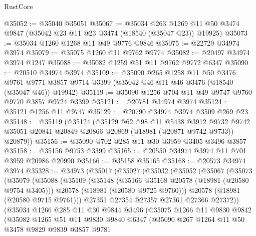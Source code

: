 \begin{lexlean}{RustCore}
\begin{coremodule}
@35052 := @35040 @35051
@35067 := @35034
    @263
    @1269
    @11
    @50
    @3474
    @9847
    (@35042 @23 @11 @23 @3474 (@18540 (@35047 @23)) @19925)
@35073 := @35034 @1260 @1268 @11 @49 @9776 @9846
@35075 := @22729 @34974 @3974
@35079 := @35075 @1260 @11 @9762 @9774
@35082 := @20497 @34974 @3974 @1247
@35088 := @35082 @1259 @51 @11 @9762 @9772 @6347
@35090 := @20510 @34974 @3974
@35109 := @35090
    @265
    @1258
    @11
    @50
    @3476
    @9761
    @9771
    @3857
    @9714
    @3399
    (@35042 @46 @11 @46 @3476 (@18540 (@35047 @46)) @19942)
@35119 := @35090 @1256 @704 @11 @49 @9747 @9760 @9770 @3857 @9724 @3399
@35121 := @20781 @34974 @3974
@35124 := @35121 @1256 @11 @9747
@35129 := @20790 @34974 @3974 @3509 @269 @23
@35148 := @35119
    (@35124
      (@35129
        @62
        @98
        @11
        @5438
        @3912
        @9732
        @9742
        @35051
        @20841
        @20849
        @20866
        @20869
        (@18981 (@20871 @9742 @9733))
        @20879))
@35156 := @35090 @702 @285 @11 @30 @3959 @3405 @3496 @3857
@35158 := @35156 @9753 @3399
@35165 := @20550 @34974 @3974 @11 @701 @3959 @20986 @20990
@35166 := @35158 @35165
@35168 := @20573 @34974 @3974
@35328 := @34973
    (@35017
      (@35027
        (@35032
          (@35052
            (@35067
              (@35073
                (@35079
                  (@35088
                    (@35109
                      (@35148
                        (@35166 @35168 @20578 (@18981 (@20580 @9754 @3405)))
                        @20578
                        (@18981 (@20580 @9725 @9760)))
                      @20578
                      (@18981 (@20580 @9715 @9761)))
                    @27351
                    @27354
                    @27357
                    @27361
                    @27366
                    @27372))
                (@35034
                  @1266
                  @285
                  @11
                  @30
                  @9844
                  @3496
                  (@35075
                    @1266
                    @11
                    @9830
                    @9842
                    (@35082
                      @1265
                      @51
                      @11
                      @9830
                      @9840
                      @6347
                      (@35090
                        @267
                        @1264
                        @11
                        @50
                        @3478
                        @9829
                        @9839
                        @3857
                        @9781

\end{coremodule}
\end{lexlean}
